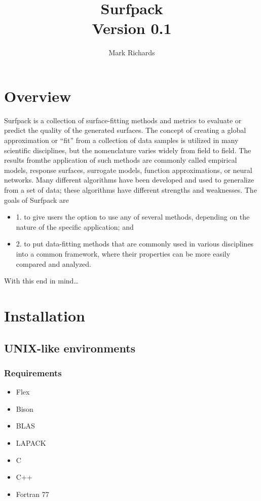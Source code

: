 \documentclass{article}
\begin{document}
\title{Surfpack\\
  Version 0.1}

\author{Mark Richards}

\maketitle

\pagebreak

\section {Overview}\label{sec:overview}
Surfpack is a collection of surface-fitting methods and metrics to evaluate or predict the quality of the generated surfaces.  The concept of creating a global approximation or ``fit'' from a collection of data samples is utilized in many scientific disciplines, but the nomenclature varies widely from field to field.  The results fromthe application of such methods are commonly called empirical models, response surfaces, surrogate models, function approximations, or neural networks.  Many different algorithms have been developed and used to generalize from a set of data; these algorithms have different strengths and weaknesses.  The goals of Surfpack are

\begin{itemize}
\item 1. to give users the option to use any of several methods, depending on the nature of the specific application; and
\item 2. to put data-fitting methods that are commonly used in various disciplines into a common framework, where their properties can be more easily compared and analyzed.
\end{itemize}

With this end in mind\ldots

\section{Installation}\label{sec:installation}
\subsection{UNIX-like environments}
\subsubsection{Requirements}
\begin{itemize}
\item Flex
\item Bison
\item BLAS
\item LAPACK
\item C
\item C++ 
\item Fortran 77
\end{itemize}
\end{document}
